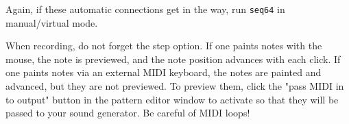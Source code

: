    Again, if these automatic connections get in the way, run \texttt{seq64} in
   manual/virtual mode.

   When recording, do not forget the step option.  If one paints notes with the
   mouse, the note is previewed, and the note position advances with each
   click.  If one paints notes via an external MIDI keyboard, the notes are
   painted and advanced, but they are not previewed.  To preview them, click
   the "pass MIDI in to output" button in the pattern editor window to activate
   so that they will be passed to your sound generator.
	Be careful of MIDI loops!

